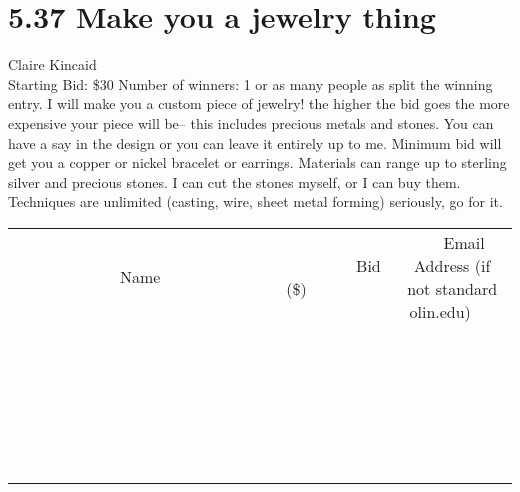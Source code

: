 \documentclass[11pt]{article}
\begin{document}
\section*{5.37 Make you a jewelry thing}
Claire Kincaid
\\
Starting Bid: \$30
\newline
Number of winners: 1 or as many people as split the winning entry.
\newline
I will make you a custom piece of jewelry!  the higher the bid goes the more expensive your piece will be-- this includes precious metals and stones. You can have a say in the design or you can leave it entirely up to me.  Minimum bid will get you a copper or nickel bracelet or earrings.  Materials can range up to sterling silver and precious stones.  I can cut the stones myself, or I can buy them.  Techniques are unlimited (casting, wire, sheet metal forming) seriously, go for it.
\\[6ex]
\begin{tabular}{c c c}
~~~~~~~~~~~~~Name~~~~~~~~~~~~~ & ~~~~~~~~~Bid (\$)~~~~~~~~~  & ~~~Email Address (if not standard olin.edu)~~~\\
 & & \\
\hline
 & & \\
\hline
 & & \\
\hline
 & & \\
\hline
 & & \\
\hline
 & & \\
\hline
 & & \\
\hline
 & & \\
\hline
 & & \\
\hline
 & & \\
\hline
 & & \\
\hline
 & & \\
\hline
 & & \\
\hline
 & & \\
\hline
 & & \\
\hline
 & & \\
\hline
 & & \\
\hline
 & & \\
\hline
 & & \\
\hline
 & & \\
\hline
 & & \\
\hline
 & & \\
\hline
 & & \\
\hline
 & & \\
\hline
 & & \\
\hline
 & & \\
\hline
\end{tabular}
\newpage
\end{document}
